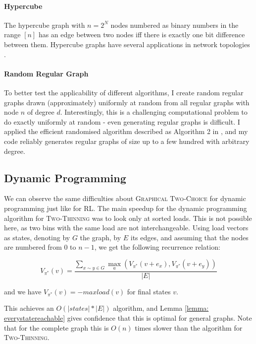 \paragraph{Hypercube} The hypercube graph with $n=2^N$ nodes numbered as binary numbers in the range $[n]$ has an edge between two nodes iff there is exactly one bit difference between them. Hypercube graphs have several applications in network topologies \cite{ostrouchov1987hypercubenetwork} .


\paragraph{Random Regular Graph} To better test the applicability of different algorithms, I create random regular graphs drawn (approximately) uniformly at random from all regular graphs with node $n$ of degree $d$. Interestingly, this is a challenging computational problem to do exactly uniformly at random - even generating regular graphs is difficult. I applied the efficient randomised algorithm described as Algorithm 2 in \cite{steger1999randomregulargraphs}, and my code reliably generates regular graphs of size up to a few hundred with arbitrary degree.



\subsection{Dynamic Programming}


We can observe the same difficulties about \textsc{Graphical Two-Choice} for dynamic programming just like for RL. The main speedup for the dynamic programming algorithm for \textsc{Two-Thinning} was to look only at sorted loads. This is not possible here, as two bins with the same load are not interchangeable. Using load vectors as states, denoting by $G$ the graph, by $E$ its edges, and assuming that the nodes are numbered from $0$ to $n-1$, we get the following recurrence relation: 


\begin{equation} \label{eq:graphicaltwochoice-dynamicprogramming}
    V_{\pi^*}(v) = \frac{\sum_{x\sim y \in G}\max_a (V_{\pi^*}(v+e_x), V_{\pi^*}(v+e_y))}{|E|}
\end{equation}


and we have $V_{\pi^*}(v)=-maxload(v)$ for final states $v$.

This achieves an $O(|states|*|E|)$ algorithm, and Lemma \ref{lemma: everystatereachable} gives confidence that this is optimal for general graphs. Note that for the complete graph this is $O(n)$ times slower than the algorithm for \textsc{Two-Thinning}.

